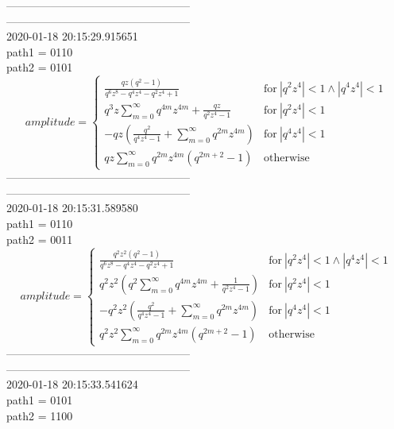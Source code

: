 \documentclass{jsreport}
\begin{document}
--------------------------------------------------\\
--------------------------------------------------\\
2020-01-18 20:15:29.915651\\
path1 = 0110\\
path2 = 0101\\
$$amplitude = \begin{cases} \frac{q z \left(q^{2} - 1\right)}{q^{6} z^{8} - q^{4} z^{4} - q^{2} z^{4} + 1} & \text{for}\: \left|{q^{2} z^{4}}\right| < 1 \wedge \left|{q^{4} z^{4}}\right| < 1 \\q^{3} z \sum_{m=0}^{\infty} q^{4 m} z^{4 m} + \frac{q z}{q^{2} z^{4} - 1} & \text{for}\: \left|{q^{2} z^{4}}\right| < 1 \\- q z \left(\frac{q^{2}}{q^{4} z^{4} - 1} + \sum_{m=0}^{\infty} q^{2 m} z^{4 m}\right) & \text{for}\: \left|{q^{4} z^{4}}\right| < 1 \\q z \sum_{m=0}^{\infty} q^{2 m} z^{4 m} \left(q^{2 m + 2} - 1\right) & \text{otherwise} \end{cases}$$
--------------------------------------------------\\
--------------------------------------------------\\
2020-01-18 20:15:31.589580\\
path1 = 0110\\
path2 = 0011\\
$$amplitude = \begin{cases} \frac{q^{2} z^{2} \left(q^{2} - 1\right)}{q^{6} z^{8} - q^{4} z^{4} - q^{2} z^{4} + 1} & \text{for}\: \left|{q^{2} z^{4}}\right| < 1 \wedge \left|{q^{4} z^{4}}\right| < 1 \\q^{2} z^{2} \left(q^{2} \sum_{m=0}^{\infty} q^{4 m} z^{4 m} + \frac{1}{q^{2} z^{4} - 1}\right) & \text{for}\: \left|{q^{2} z^{4}}\right| < 1 \\- q^{2} z^{2} \left(\frac{q^{2}}{q^{4} z^{4} - 1} + \sum_{m=0}^{\infty} q^{2 m} z^{4 m}\right) & \text{for}\: \left|{q^{4} z^{4}}\right| < 1 \\q^{2} z^{2} \sum_{m=0}^{\infty} q^{2 m} z^{4 m} \left(q^{2 m + 2} - 1\right) & \text{otherwise} \end{cases}$$
--------------------------------------------------\\
--------------------------------------------------\\
2020-01-18 20:15:33.541624\\
path1 = 0101\\
path2 = 1100\\
\end{document}
